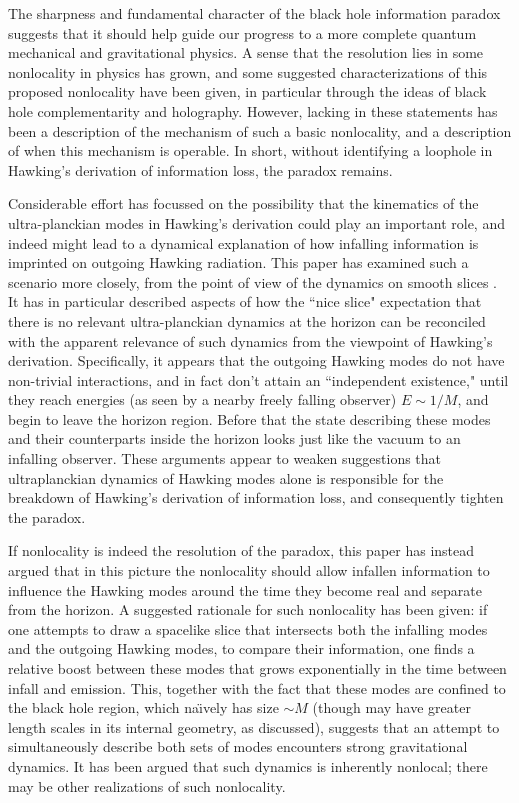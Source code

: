 
The sharpness and fundamental character  of the black hole information paradox suggests that it should help guide our progress to a more complete quantum mechanical and gravitational physics.  A sense that the resolution lies in some nonlocality in physics has grown, and some suggested characterizations of this proposed nonlocality have been given, in particular through the ideas of black hole complementarity and holography.  However, lacking in these statements has been a description of the mechanism of such a basic nonlocality, and a description of when this mechanism is operable.  In short, without identifying a  loophole in Hawking's derivation of information loss, the paradox remains.

Considerable effort has focussed on the possibility that the kinematics of the ultra-planckian modes in Hawking's derivation could play an important role, and indeed might lead to a dynamical explanation of how infalling information is imprinted on outgoing Hawking radiation.  This paper has examined such a scenario more closely, from the point of view of the dynamics on smooth slices .  It has in particular described aspects of how the ``nice slice" expectation that there is no relevant ultra-planckian dynamics at the horizon can be reconciled with the apparent relevance of such dynamics from the viewpoint of Hawking's derivation.  Specifically, it appears that the outgoing Hawking modes do not have non-trivial interactions, and in fact don't attain an ``independent existence," until they reach energies (as seen by a nearby freely falling observer) $E\sim 1/M$, and begin to leave the horizon region.  Before that the state describing these modes and their counterparts inside the horizon looks just like the vacuum to an infalling observer.  These arguments appear to weaken  suggestions that ultraplanckian dynamics of Hawking modes alone is responsible for the breakdown of Hawking's derivation of information loss, and consequently tighten the paradox.

If nonlocality is indeed the resolution of the paradox, this paper has instead argued that in this picture the nonlocality should allow infallen information to influence the Hawking modes around the time they become real and separate from the horizon.  A suggested rationale for such nonlocality has been given:  if one attempts to draw  a spacelike slice that intersects both the  infalling modes and the outgoing Hawking modes, to compare their information, one finds a relative boost between these modes that grows exponentially in the time between infall and emission.  This, together with the fact that these modes are confined to the black hole region, which na\"\i vely has size $\sim M$ (though may have greater length scales in its internal geometry, as discussed), suggests that an attempt to simultaneously describe both sets of modes encounters strong gravitational dynamics.  It has been argued  that such dynamics is inherently nonlocal; there may be other realizations of such nonlocality.

